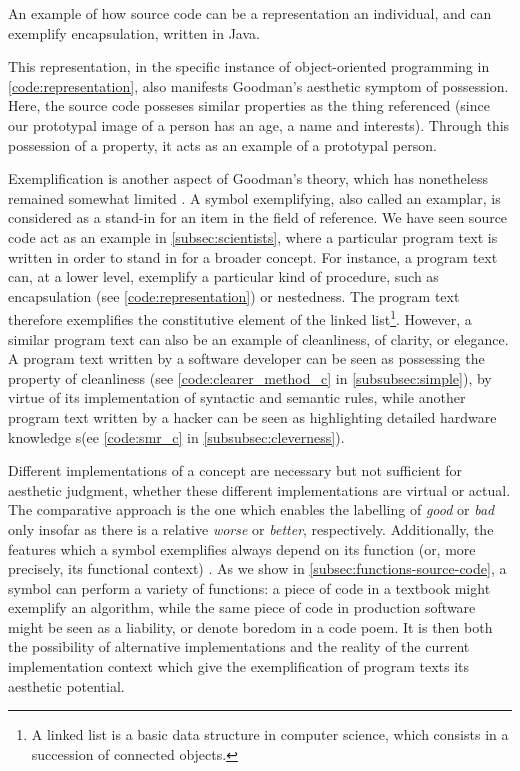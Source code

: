 \begin{listing}
    \inputminted{java}{./corpus/representation.java}
    \caption{An example of how source code can be a representation an individual, and can exemplify encapsulation, written in Java.}
    \label{code:representation}
\end{listing}

This representation, in the specific instance of object-oriented programming in \ref{code:representation}, also manifests Goodman's aesthetic symptom of possession. Here, the source code posseses similar properties as the thing referenced (since our prototypal image of a person has an age, a name and interests). Through this possession of a property, it acts as an example of a prototypal person.

Exemplification is another aspect of Goodman's theory, which has nonetheless remained somewhat limited \citep{elgin_making_2011}. A symbol exemplifying, also called an examplar, is considered as a stand-in for an item in the field of reference. We have seen source code act as an example in \ref{subsec:scientists}, where a particular program text is written in order to stand in for a broader concept. For instance, a program text can, at a lower level, exemplify a particular kind of procedure, such as encapsulation (see \ref{code:representation}) or nestedness. The program text therefore exemplifies the constitutive element of the linked list\footnote{A linked list is a basic data structure in computer science, which consists in a succession of connected objects.}. However, a similar program text can also be an example of cleanliness, of clarity, or elegance. A program text written by a software developer can be seen as possessing the property of cleanliness (see \ref{code:clearer_method_c} in \ref{subsubsec:simple}), by virtue of its implementation of syntactic and semantic rules, while another program text written by a hacker can be seen as highlighting detailed hardware knowledge s(ee \ref{code:smr_c} in \ref{subsubsec:cleverness}).

Different implementations of a concept are necessary but not sufficient for aesthetic judgment, whether these different implementations are virtual or actual. The comparative approach is the one which enables the labelling of \emph{good} or \emph{bad} only insofar as there is a relative \emph{worse} or \emph{better}, respectively. Additionally, the features which a symbol exemplifies always depend on its function (or, more precisely, its functional context) \citep{elgin_understanding_1993}. As we show in \ref{subsec:functions-source-code}, a symbol can perform a variety of functions: a piece of code in a textbook might exemplify an algorithm, while the same piece of code in production software might be seen as a liability, or denote boredom in a code poem. It is then both the possibility of alternative implementations and the reality of the current implementation context which give the exemplification of program texts its aesthetic potential.

